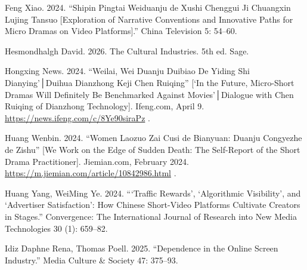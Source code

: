 \documentclass[10pt,a4paper]{article}
\begin{document}
\noindent\begin{minipage}{\linewidth}Feng Xiao. 2024. “Shipin Pingtai Weiduanju de Xushi Chenggui Ji Chuangxin Lujing Tansuo [Exploration of Narrative Conventions and Innovative Paths for Micro Dramas on Video Platforms].” China Television 5: 54–60.\par\end{minipage}\par
\noindent\begin{minipage}{\linewidth}Hesmondhalgh David. 2026. The Cultural Industries. 5th ed. Sage.\par\end{minipage}\par
\noindent\begin{minipage}{\linewidth}Hongxing News. 2024. “Weilai, Wei Duanju Duibiao De Yiding Shi Dianying’│Duihua Dianzhong Keji Chen Ruiqing” [‘In the Future, Micro-Short Dramas Will Definitely Be Benchmarked Against Movies’│Dialogue with Chen Ruiqing of Dianzhong Technology]. Ifeng.com, April 9. \url{https://news.ifeng.com/c/8Ye90siraPz} .\par\end{minipage}\par
\noindent\begin{minipage}{\linewidth}Huang Wenbin. 2024. “Women Laozuo Zai Cusi de Bianyuan: Duanju Congyezhe de Zishu” [We Work on the Edge of Sudden Death: The Self-Report of the Short Drama Practitioner]. Jiemian.com, February 2024. \url{https://m.jiemian.com/article/10842986.html} .\par\end{minipage}\par
\noindent\begin{minipage}{\linewidth}Huang Yang, WeiMing Ye. 2024. “‘Traffic Rewards’, ‘Algorithmic Visibility’, and ‘Advertiser Satisfaction’: How Chinese Short-Video Platforms Cultivate Creators in Stages.” Convergence: The International Journal of Research into New Media Technologies 30 (1): 659–82.\par\end{minipage}\par
\noindent\begin{minipage}{\linewidth}Idiz Daphne Rena, Thomas Poell. 2025. “Dependence in the Online Screen Industry.” Media Culture \& Society 47: 375–93.\par\end{minipage}\par
\end{document}
